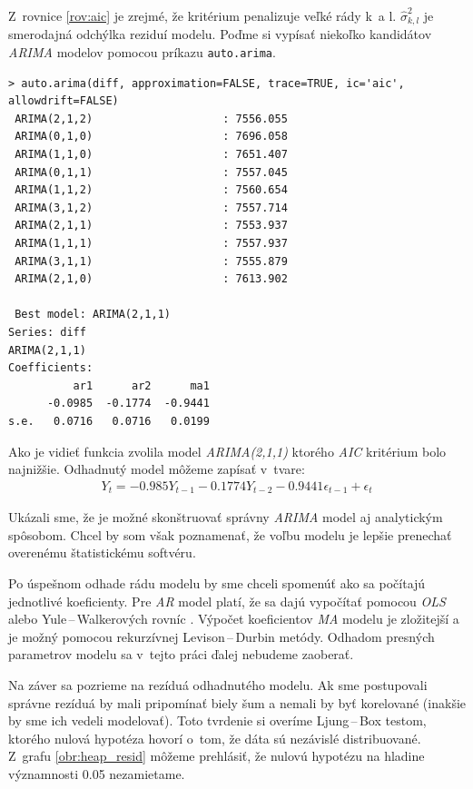 \documentclass[12pt,a4paper,oneside,final]{article}
\theoremstyle{definition}
\theoremstyle{remark}
\numberwithin{equation}{section}
\begin{document}
Z~rovnice \ref{rov:aic} je zrejmé, že kritérium penalizuje veľké rády k~a l. 
$\hat{\sigma}^{2}_{k,l}$ je smerodajná odchýlka reziduí modelu. 
Poďme si vypísať niekoľko kandidátov \emph{ARIMA} modelov pomocou príkazu
\texttt{auto.arima}.

\begin{minipage}{\linewidth}
\begingroup
\fontsize{9pt}{7pt}\selectfont %
\begin{verbatim}
> auto.arima(diff, approximation=FALSE, trace=TRUE, ic='aic', allowdrift=FALSE)
 ARIMA(2,1,2)                    : 7556.055
 ARIMA(0,1,0)                    : 7696.058
 ARIMA(1,1,0)                    : 7651.407
 ARIMA(0,1,1)                    : 7557.045
 ARIMA(1,1,2)                    : 7560.654
 ARIMA(3,1,2)                    : 7557.714
 ARIMA(2,1,1)                    : 7553.937
 ARIMA(1,1,1)                    : 7557.937
 ARIMA(3,1,1)                    : 7555.879
 ARIMA(2,1,0)                    : 7613.902

 Best model: ARIMA(2,1,1)                    
Series: diff 
ARIMA(2,1,1)                    
Coefficients:
          ar1      ar2      ma1
      -0.0985  -0.1774  -0.9441
s.e.   0.0716   0.0716   0.0199
\end{verbatim}
\endgroup
\end{minipage}

Ako je vidieť funkcia zvolila model \emph{ARIMA(2,1,1)} ktorého \emph{AIC} kritérium bolo najnižšie.
Odhadnutý model môžeme zapísať v~tvare:
\begin{eqnarray} \label{rov:arima_model}
    Y_t = -0.985 Y_{t-1} - 0.1774 Y_{t-2} -0.9441\epsilon_{t-1} + \epsilon_{t}
\end{eqnarray}

Ukázali sme, že je možné skonštruovať správny \emph{ARIMA} model aj analytickým spôsobom. 
Chcel by som však poznamenať, že voľbu modelu je lepšie prenechať overenému 
štatistickému softvéru. 

Po úspešnom odhade rádu modelu by sme chceli spomenúť ako sa počítajú jednotlivé
koeficienty. Pre \emph{AR} model platí, že sa dajú vypočítať pomocou \emph{OLS} alebo Yule\,--\,Walkerových
rovníc \cite{brockwell_ts}. Výpočet koeficientov \emph{MA} modelu je zložitejší a 
je možný pomocou rekurzívnej Levison\,--\,Durbin metódy.
Odhadom presných parametrov modelu sa v~tejto práci ďalej nebudeme zaoberať.  

Na záver sa pozrieme na rezíduá odhadnutého modelu. Ak sme postupovali správne rezíduá by
mali pripomínať biely šum a nemali by byť korelované (inakšie by sme ich
vedeli modelovať). Toto tvrdenie si overíme Ljung\,--\,Box testom, ktorého nulová hypotéza
hovorí o~tom, že dáta sú nezávislé distribuované. Z~grafu \ref{obr:heap_resid} môžeme
prehlásiť, že nulovú hypotézu na hladine významnosti 0.05 nezamietame.
\end{document}
